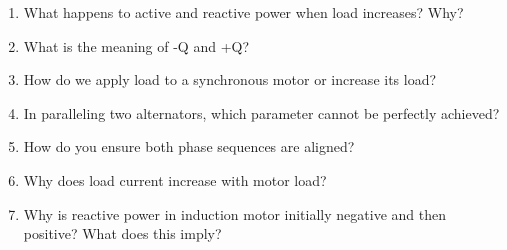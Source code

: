 \documentclass[12pt,a4paper]{article}
\begin{document}
\begin{enumerate}
		\item What happens to active and reactive power when load increases? Why?
		\item What is the meaning of -Q and +Q?
		\item How do we apply load to a synchronous motor or increase its load?
		\item In paralleling two alternators, which parameter cannot be perfectly achieved?
		\item How do you ensure both phase sequences are aligned?
		\item Why does load current increase with motor load?
		\item Why is reactive power in induction motor initially negative and then positive? What does this imply?
	\end{enumerate}
	
\end{document}
